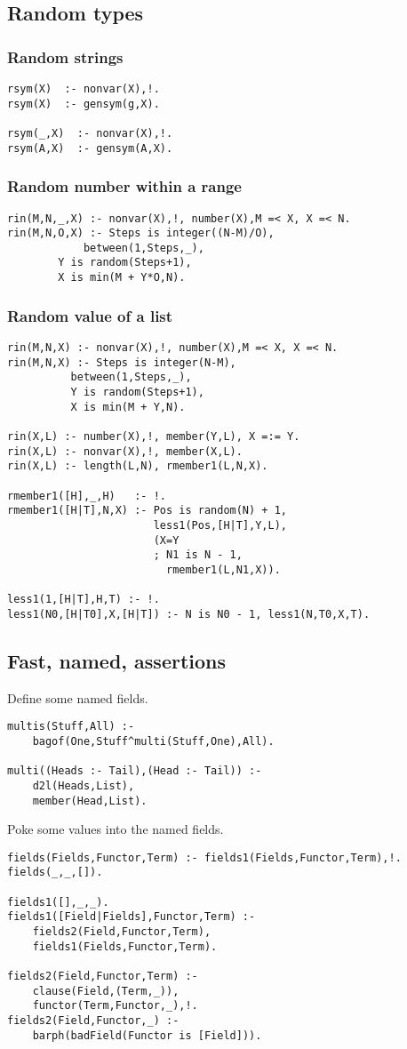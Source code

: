 \subsection{ Random types
}
\subsubsection{ Random strings }\begin{Verbatim}
rsym(X)  :- nonvar(X),!.
rsym(X)  :- gensym(g,X).

rsym(_,X)  :- nonvar(X),!.
rsym(A,X)  :- gensym(A,X).
\end{Verbatim}
\subsubsection{ Random number within a range }\begin{Verbatim}
rin(M,N,_,X) :- nonvar(X),!, number(X),M =< X, X =< N.
rin(M,N,O,X) :- Steps is integer((N-M)/O),
	        between(1,Steps,_),
		Y is random(Steps+1),
		X is min(M + Y*O,N).
\end{Verbatim}
\subsubsection{ Random value of a list }\begin{Verbatim}
rin(M,N,X) :- nonvar(X),!, number(X),M =< X, X =< N.
rin(M,N,X) :- Steps is integer(N-M),
	      between(1,Steps,_),
	      Y is random(Steps+1),
	      X is min(M + Y,N).

rin(X,L) :- number(X),!, member(Y,L), X =:= Y.
rin(X,L) :- nonvar(X),!, member(X,L).
rin(X,L) :- length(L,N), rmember1(L,N,X).

rmember1([H],_,H)   :- !.
rmember1([H|T],N,X) :- Pos is random(N) + 1,
                       less1(Pos,[H|T],Y,L),
                       (X=Y
                       ; N1 is N - 1,
                         rmember1(L,N1,X)).

less1(1,[H|T],H,T) :- !.
less1(N0,[H|T0],X,[H|T]) :- N is N0 - 1, less1(N,T0,X,T).
\end{Verbatim}
\subsection{ Fast, named, assertions
}
 Define  some named fields.  \begin{Verbatim}
multis(Stuff,All) :-
	bagof(One,Stuff^multi(Stuff,One),All).

multi((Heads :- Tail),(Head :- Tail)) :-
	d2l(Heads,List),
	member(Head,List).
\end{Verbatim}
 Poke some values into the named fields.  \begin{Verbatim}
fields(Fields,Functor,Term) :- fields1(Fields,Functor,Term),!.
fields(_,_,[]).

fields1([],_,_).
fields1([Field|Fields],Functor,Term) :-
	fields2(Field,Functor,Term),
	fields1(Fields,Functor,Term).

fields2(Field,Functor,Term) :-
	clause(Field,(Term,_)),
	functor(Term,Functor,_),!.
fields2(Field,Functor,_) :-
	barph(badField(Functor is [Field])).
\end{Verbatim}
